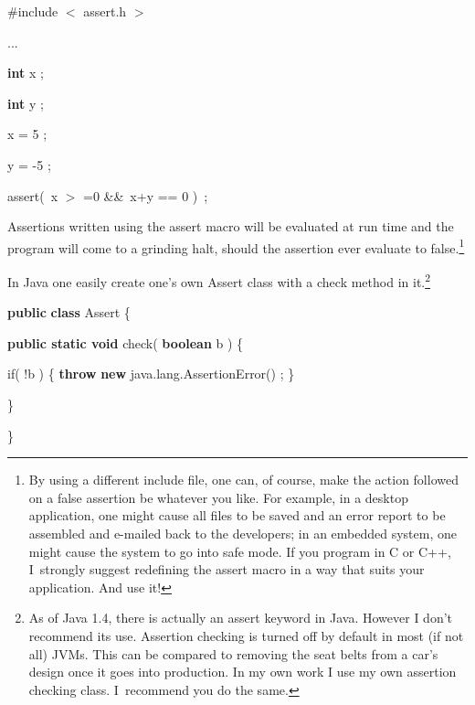 \documentclass[muchmore,11pt]{article}%
\begin{document}
\begin{code}
\#include
$<$%
assert.h%
$>$%


...

\textbf{int} x ;

\textbf{int} y ;

x = 5 ;

y = -5 ;

assert(\ x
$>$%
=0 \&\&\ x+y == 0 )\ ;
\end{code}

\noindent Assertions written using the \textsf{assert} macro will be evaluated
at run time and the program will come to a grinding halt, should the assertion
ever evaluate to false.\footnote{By using a different include file, one can,
of course, make the action followed on a false assertion be whatever you like.
For example, in a desktop application, one might cause all files to be saved
and an error report to be assembled and e-mailed back to the developers; in an
embedded system, one might cause the system to go into safe mode. If you
program in C or C++, I\ strongly suggest redefining the assert macro in a way
that suits your application. And use it!}

In Java one easily create one's own \textsf{Assert} class with a
\textsf{check} method in it.\footnote{As of Java 1.4, there is actually an
\textsf{assert} keyword in Java. However I don't recommend its use. Assertion
checking is turned off by default in most (if not all) JVMs. This can be
compared to removing the seat belts from a car's design once it goes into
production. In my own work I use my own assertion checking class. I\ recommend
you do the same.}

\begin{code}
\textbf{public} \textbf{class} Assert \{

\begin{indent}
\item \textbf{public static void} check( \textbf{boolean} b ) \{

\begin{indent}
\item if( !b ) \{ \textbf{throw} \textbf{new} java.lang.AssertionError() ; \}
\end{indent}

\item \}
\end{indent}

\}
\end{code}
\end{document}
